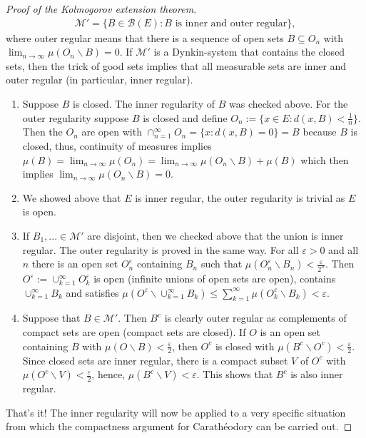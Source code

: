 \begin{proof}[Proof of the Kolmogorov extension theorem]
	\begin{align*}
		\mathcal M'=\{B\in \mathcal B(E): B\text{ is inner and outer regular}\},
	\end{align*}
	where outer regular means that there is a sequence of open sets $B\subseteq O_n$ with $\lim_{n\to\infty}\mu(O_n\backslash B)= 0$. If $\mathcal M'$ is a Dynkin-system that contains the closed sets, then the trick of good sets implies that all measurable sets are inner and outer regular (in particular, inner regular).
	\begin{enumerate}[label=(\roman*)]
		\item Suppose $B$ is closed. The inner regularity of $B$ was checked above. For the outer regularity suppose $B$ is closed and define $O_n:=\{x\in E: d(x,B)<\frac{1}{n}\}$. Then the $O_n$ are open with $\cap_{n=1}^\infty O_n=\{x: d(x,B)=0\}=B$ because $B$ is closed, thus, continuity of measures implies $\mu(B)=\lim_{n\to\infty}\mu(O_n)=\lim_{n\to\infty}\mu(O_n\backslash B)+\mu(B)$ which then implies $\lim_{n\to\infty}\mu(O_n\backslash B)= 0$.
		\item We showed above that $E$ is inner regular, the outer regularity is trivial as $E$ is open.
		\item If $B_1,...\in \mathcal M'$ are disjoint, then we checked above that the union is inner regular. The outer regularity is proved in the same way. For all $\varepsilon>0$ and all $n$ there is an open set $O^\varepsilon_n$ containing $B_n$ such that $\mu(O^\varepsilon_n\backslash B_n)<\frac{\varepsilon}{2^n}$. Then $O^\varepsilon:=\cup_{k=1}^\infty O^\varepsilon_k$ is open (infinite unions of open sets are open), contains $\cup_{k=1}^\infty B_k$ and satisfies $\mu(O^\varepsilon\backslash \cup_{k=1}^\infty B_k)\leq \sum_{k=1}^\infty \mu(O^\varepsilon_k\backslash B_k)< \varepsilon$.
		\item Suppose that $B\in \mathcal M'$. Then $B^c$ is clearly outer regular as complements of compact sets are open (compact sets are closed). If $O$ is an open set containing $B$ with $\mu(O\backslash B)<\frac{\varepsilon}{2}$, then $O^c$ is closed with $\mu(B^c\backslash O^c)<\frac{\varepsilon}{2}$. Since closed sets are inner regular, there is a compact subset $V$ of $O^c$ with $\mu(O^c\backslash V)<\frac{\varepsilon}{2}$, hence, $\mu(B^c\backslash V)<\varepsilon$. This shows that $B^c$ is also inner regular.
	\end{enumerate}
	That's it! The inner regularity will now be applied to a very specific situation from which the compactness argument for Carath\'eodory can be carried out.

\end{proof}

